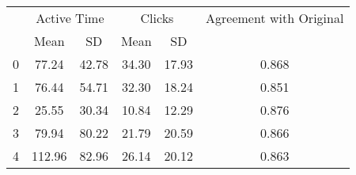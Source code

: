\begin{tabular}{lccccc}
\toprule
 & \multicolumn{2}{c}{Active Time} & \multicolumn{2}{c}{Clicks} & Agreement with Original \\
 & Mean & SD & Mean & SD &  \\
\midrule
0 & 77.24 & 42.78 & 34.30 & 17.93 & 0.868 \\
1 & 76.44 & 54.71 & 32.30 & 18.24 & 0.851 \\
2 & 25.55 & 30.34 & 10.84 & 12.29 & 0.876 \\
3 & 79.94 & 80.22 & 21.79 & 20.59 & 0.866 \\
4 & 112.96 & 82.96 & 26.14 & 20.12 & 0.863 \\
\bottomrule
\end{tabular}
